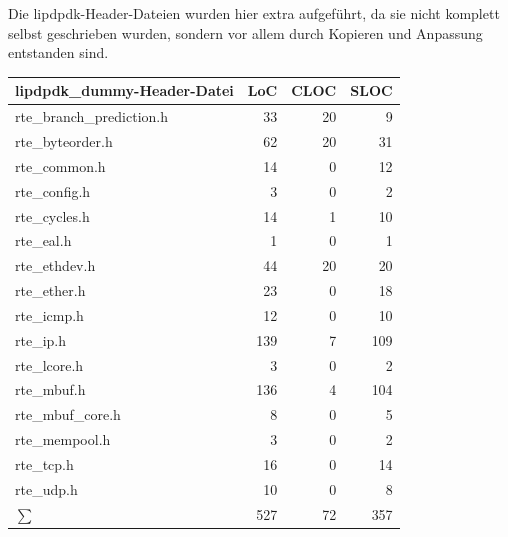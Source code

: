 \documentclass[../review_3.tex]{subfiles}
\begin{document}
Die lipdpdk-Header-Dateien wurden hier extra aufgeführt, da sie nicht komplett selbst geschrieben wurden, sondern vor allem durch Kopieren und Anpassung entstanden sind.
\begin{longtable}[H]{p{10cm}rrr} \toprule
    \textbf{lipdpdk\_dummy-Header-Datei} & \textbf{LoC} & \textbf{CLOC} & \textbf{SLOC} \\ \midrule \endhead
    rte\_branch\_prediction.h            & 33           & 20            & 9             \\
    rte\_byteorder.h                     & 62           & 20            & 31            \\
    rte\_common.h                        & 14           & 0             & 12            \\
    rte\_config.h                        & 3            & 0             & 2             \\
    rte\_cycles.h                        & 14           & 1             & 10            \\
    rte\_eal.h                           & 1            & 0             & 1             \\
    rte\_ethdev.h                        & 44           & 20            & 20            \\
    rte\_ether.h                         & 23           & 0             & 18            \\
    rte\_icmp.h                          & 12           & 0             & 10            \\
    rte\_ip.h                            & 139          & 7             & 109           \\
    rte\_lcore.h                         & 3            & 0             & 2             \\
    rte\_mbuf.h                          & 136          & 4             & 104           \\
    rte\_mbuf\_core.h                    & 8            & 0             & 5             \\
    rte\_mempool.h                       & 3            & 0             & 2             \\
    rte\_tcp.h                           & 16           & 0             & 14            \\
    rte\_udp.h                           & 10           & 0             & 8             \\ \midrule
    $\sum$                               & 527          & 72            & 357           \\ \bottomrule
\end{longtable}
\end{document}
